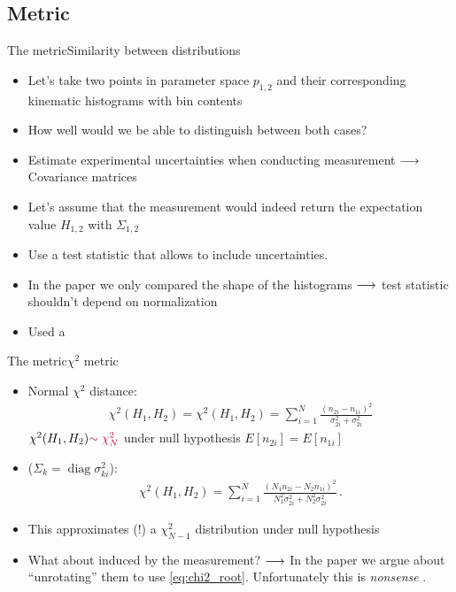 \subsection{Metric}
\begin{frame}{The metric}{Similarity between distributions}
	\begin{itemize}[<+->]
		\item Let's take two points in parameter space $p_{1,2}$ and their corresponding kinematic histograms  with bin contents 
		\item How well would we be able to distinguish between both cases?
		\item Estimate experimental uncertainties when conducting measurement  $\longrightarrow$ Covariance matrices  
		\item Let's assume that the measurement would indeed return the expectation value $H_{1,2}$ with $\Sigma_{1,2}$
		\item Use a test statistic that allows to include uncertainties.  
		\item In the paper we only compared the shape of the histograms $\longrightarrow$ test statistic shouldn't depend on normalization
		\item Used a  	
	\end{itemize}
\end{frame}

\begin{frame}{The metric}{$\chi^2$ metric}
	\begin{itemize}[<+->]
		\item Normal $\chi^2$ distance: 
		\begin{align}
		\chi^2(H_1, H_2) = \chi^2(H_1, H_2) = \sum_{i=1}^N \frac{(n_{2i}-n_{1i})^2}{\sigma_{2i}^2+\sigma_{2i}^2}
		\label{eq:chi2_nonorm}
		\end{align}
		$\chi^2(H_1,H_2){\color{purple}\sim \chi^2_N}$ under null hypothesis $E[n_{2i}]=E[n_{1i}]$
		\item {} ($\Sigma_k = \operatorname{diag}\sigma_{ki}^2$):
		\begin{align}
		  \chi^2(H_1, H_2) = \sum_{i=1}^N \frac{(N_1n_{2i}-N_2n_{1i})^2}{N_1^2\sigma_{2i}^2+N_2^2\sigma_{2i}^2}\,.
		  \label{eq:chi2_root}
		\end{align}
		\item This approximates (!) a $\chi^2_{N-1}$ distribution under null hypothesis 
		\item What about  induced by the measurement? $\longrightarrow$ In the paper we argue about \enquote{unrotating} them to use \eqref{eq:chi2_root}. Unfortunately this is \emph{nonsense} . 
	\end{itemize}
\end{frame}

